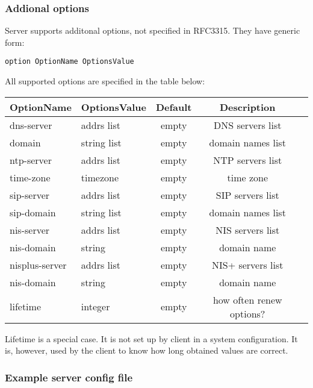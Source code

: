 \subsubsection{Addional options}
Server supports additonal options, not specified in RFC3315. They have
generic form:

\begin{verbatim}
option OptionName OptionsValue
\end{verbatim}

All supported options are specified in the table below:

\begin{center}
\begin{tabular}{|l|l|c|c|l|}
\hline
OptionName       & OptionsValue& Default    & Description \\ \hline
dns-server       & addrs list  & empty      & DNS servers list \\
domain           & string list & empty      & domain names list \\
ntp-server       & addrs list  & empty      & NTP servers list \\
time-zone        & timezone    & empty      & time zone \\
sip-server       & addrs list  & empty      & SIP servers list \\
sip-domain       & string list & empty      & domain names list \\

nis-server       & addrs list  & empty      & NIS servers list \\
nis-domain       & string      & empty      & domain name \\

nisplus-server   & addrs list  & empty      & NIS+ servers list \\
nis-domain       & string      & empty      & domain name \\
lifetime         & integer     & empty      & how often renew options? \\
\hline
\end{tabular}
\end{center}

Lifetime is a special case. It is not set up by client in a system
configuration. It is, however, used by the client to know how long
obtained values are correct.

\subsubsection{Example server config file}

